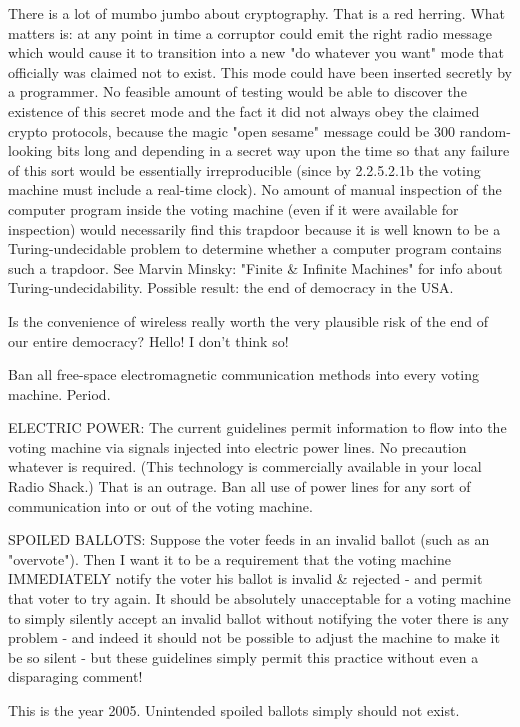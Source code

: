 There is a lot of mumbo jumbo about cryptography.  That is a red
herring. What matters is: at any point in time a corruptor could emit the right
radio message which would cause it to transition into a new "do whatever you
want" mode that officially was claimed not to exist.  This mode could have been
inserted secretly by a programmer.  No feasible amount of testing would be able
to discover the existence of this secret mode and the fact it did not
always obey the claimed crypto protocols, because the magic "open sesame" message could be 300
random-looking bits long and depending in a secret way upon the time so that any
failure of this sort would be essentially irreproducible (since by 2.2.5.2.1b the
voting machine must include a real-time clock).  No amount of manual inspection of the
computer program inside the voting machine (even if it were available for
inspection) would necessarily find this trapdoor because it is well known to be a
Turing-undecidable problem to determine whether a computer program
contains such a trapdoor.  See Marvin Minsky: "Finite & Infinite Machines" for info about
Turing-undecidability. Possible result: the end of democracy in the USA.

Is the convenience of wireless really worth the very plausible risk of
the end of our entire democracy?  Hello!  I don't think so!

Ban all free-space electromagnetic communication methods into every
voting machine.
Period.

ELECTRIC POWER:
The current guidelines permit information to flow into the voting
machine via signals injected into electric power lines.  No precaution 
whatever is required.
(This technology is commercially available in your local Radio Shack.)
That is an outrage.  Ban all use of power lines for any sort of
communication
into or out of the voting machine.

SPOILED BALLOTS:
Suppose the voter feeds in an invalid ballot (such as an "overvote").
Then I want it to be a requirement that the voting machine IMMEDIATELY
notify the voter his ballot is invalid & rejected - and permit that
voter to try again.
It should be absolutely unacceptable for a voting machine to simply
silently accept an invalid ballot without notifying the voter there is any
problem - and indeed it should not be possible to adjust the machine to make it be so 
silent - but these guidelines simply permit this practice without even a disparaging
comment!

This is the year 2005.  Unintended spoiled ballots simply should not
exist.

